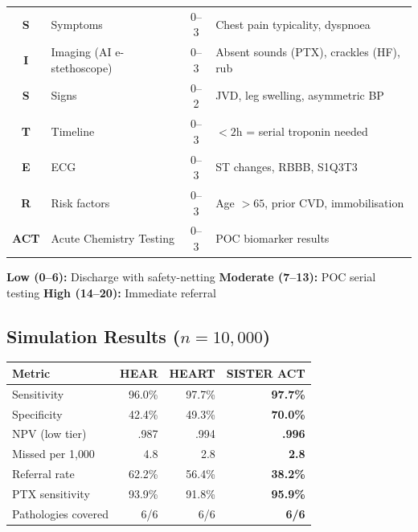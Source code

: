 \documentclass[11pt,a4paper]{article}
\begin{document}
\begin{tcolorbox}[resultbox, title={SISTER ACT = S-I-S-T-E-R-ACT (0--20 points)}]
\begin{tabular}{@{}clcl@{}}
\textbf{S} & Symptoms        & 0--3 & Chest pain typicality, dyspnoea \\
\textbf{I} & Imaging (AI e-stethoscope) & 0--3 & Absent sounds (PTX), crackles (HF), rub \\
\textbf{S} & Signs           & 0--2 & JVD, leg swelling, asymmetric BP \\
\textbf{T} & Timeline        & 0--3 & $<2$h = serial troponin needed \\
\textbf{E} & ECG             & 0--3 & ST changes, RBBB, S1Q3T3 \\
\textbf{R} & Risk factors    & 0--3 & Age $>65$, prior CVD, immobilisation \\
\textbf{ACT} & Acute Chemistry Testing & 0--3 & POC biomarker results \\
\end{tabular}
\end{tcolorbox}

\begin{tcolorbox}[alertbox, title={Three Tiers}]
\textbf{Low (0--6):} Discharge with safety-netting \quad
\textbf{Moderate (7--13):} POC serial testing \quad
\textbf{High (14--20):} Immediate referral
\end{tcolorbox}

\subsection{Simulation Results ($n = 10{,}000$)}

\begin{table}[h]
\centering\small
\begin{tabular}{@{}lrrr@{}}
\toprule
\textbf{Metric} & \textbf{HEAR} & \textbf{HEART} & \textbf{SISTER ACT} \\
\midrule
Sensitivity         & 96.0\% & 97.7\% & \textbf{97.7\%} \\
Specificity         & 42.4\% & 49.3\% & \textbf{70.0\%} \\
NPV (low tier)      & .987   & .994   & \textbf{.996} \\
Missed per 1{,}000  & 4.8    & 2.8    & \textbf{2.8} \\
Referral rate       & 62.2\% & 56.4\% & \textbf{38.2\%} \\
PTX sensitivity     & 93.9\% & 91.8\% & \textbf{95.9\%} \\
Pathologies covered & 6/6    & 6/6    & \textbf{6/6} \\
\bottomrule
\end{tabular}
\end{table}
\end{document}
